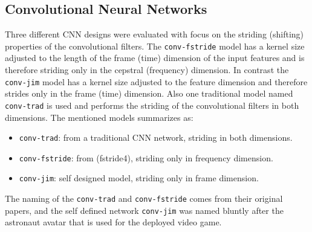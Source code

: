 \subsection{Convolutional Neural Networks}\label{sec:nn_arch_cnn}
Three different CNN designs were evaluated with focus on the striding (shifting) properties of the convolutional filters.
The \texttt{conv-fstride} model has a kernel size adjusted to the length of the frame (time) dimension of the input features and is therefore striding only in the cepstral (frequency) dimension.
In contrast the \texttt{conv-jim} model has a kernel size adjusted to the feature dimension and therefore strides only in the frame (time) dimension.
Also one traditional model named \texttt{conv-trad} is used and performs the striding of the convolutional filters in both dimensions.
The mentioned models summarizes as:
\begin{itemize}
	\item \texttt{conv-trad}: from \cite{Sainath2015} a traditional CNN network, striding in both dimensions.
	\item \texttt{conv-fstride}: from \cite{Sainath2015} (fstride4), striding only in frequency dimension.
	\item \texttt{conv-jim}: self designed model, striding only in frame dimension.
\end{itemize}
The naming of the \texttt{conv-trad} and \texttt{conv-fstride} comes from their original papers, and the self defined network \texttt{conv-jim} was named bluntly after the astronaut avatar that is used for the deployed video game.

